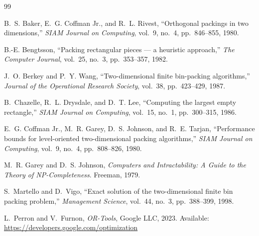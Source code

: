 \documentclass[11pt,a4paper]{article}
\begin{document}
\begin{thebibliography}{99}

B.~S. Baker, E.~G. Coffman Jr., and R.~L. Rivest,
``Orthogonal packings in two dimensions,''
\textit{SIAM Journal on Computing}, vol.~9, no.~4, pp.~846--855, 1980.

B.-E. Bengtsson,
``Packing rectangular pieces --- a heuristic approach,''
\textit{The Computer Journal}, vol.~25, no.~3, pp.~353--357, 1982.

J.~O. Berkey and P.~Y. Wang,
``Two-dimensional finite bin-packing algorithms,''
\textit{Journal of the Operational Research Society}, vol.~38, pp.~423--429, 1987.

B.~Chazelle, R.~L. Drysdale, and D.~T. Lee,
``Computing the largest empty rectangle,''
\textit{SIAM Journal on Computing}, vol.~15, no.~1, pp.~300--315, 1986.

E.~G. Coffman Jr., M.~R. Garey, D.~S. Johnson, and R.~E. Tarjan,
``Performance bounds for level-oriented two-dimensional packing algorithms,''
\textit{SIAM Journal on Computing}, vol.~9, no.~4, pp.~808--826, 1980.

M.~R. Garey and D.~S. Johnson,
\textit{Computers and Intractability: A Guide to the Theory of NP-Completeness}.
Freeman, 1979.

S.~Martello and D.~Vigo,
``Exact solution of the two-dimensional finite bin packing problem,''
\textit{Management Science}, vol.~44, no.~3, pp.~388--399, 1998.

L.~Perron and V.~Furnon,
\textit{OR-Tools}, Google LLC, 2023.
Available: \url{https://developers.google.com/optimization}

\end{thebibliography}
\end{document}
